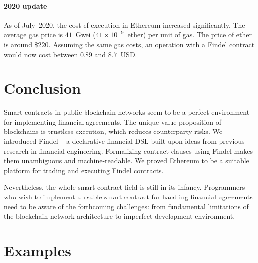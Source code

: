 \paragraph{2020 update}
As of July~2020, the cost of execution in Ethereum increased significantly.
The average gas price is $41$~Gwei ($41 \times 10^{-9}$~ether) per unit of gas.
The price of ether is around $\$220$.
Assuming the same gas costs, an operation with a Findel contract would now cost between $0.89$ and $8.7$~USD.


\section{Conclusion}

Smart contracts in public blockchain networks seem to be a perfect environment for implementing financial agreements.
The unique value proposition of blockchains is trustless execution, which reduces counterparty risks.
We introduced Findel -- a declarative financial DSL built upon ideas from previous research in financial engineering.
Formalizing contract clauses using Findel makes them unambiguous and machine-readable.
We proved Ethereum to be a suitable platform for trading and executing Findel contracts.

Nevertheless, the whole smart contract field is still in its infancy.
Programmers who wish to implement a usable smart contract for handling financial agreements need to be aware of the forthcoming challenges: from fundamental limitations of the blockchain network architecture to imperfect development environment.


\section{Examples} \label{sec:Ch10FindelExamples}

